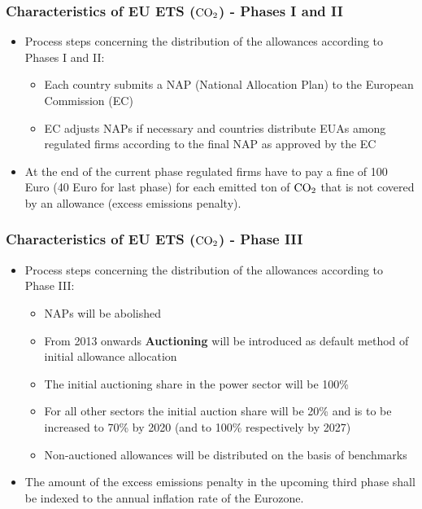   \begin{frame}
  \frametitle{Characteristics of EU ETS ($\textnormal{CO}_2$) - Phases I and II}
  \begin{itemize}
  \item<1-> Process steps concerning the distribution of the allowances according to Phases I and II:
  \begin{itemize}
  \item Each country submits a NAP (National Allocation Plan) to the European Commission (EC)
  \item EC adjusts NAPs if necessary and countries distribute EUAs among regulated firms according to the final NAP as approved by the EC
  \end{itemize}
  \item<2-> At the end of the current phase regulated firms have to pay a fine of 100 Euro (40 Euro for last phase) for each emitted ton of $\textnormal{CO}_2$ that is not covered by an allowance (excess emissions penalty).
  \end{itemize}
\end{frame}

  \begin{frame}
  \frametitle{Characteristics of EU ETS ($\textnormal{CO}_2$) - Phase III}
  \begin{itemize}
  \item<1-> Process steps concerning the distribution of the allowances according to Phase III:
  \begin{itemize}
  \item NAPs will be abolished
  \item From 2013 onwards \textbf{Auctioning} will be introduced as default method of initial allowance allocation
  \item The initial auctioning share  in the power sector will be 100\%
  \item For all other sectors the initial auction share will be 20\% and is to be increased to 70\% by 2020 (and to 100\% respectively by 2027)
  \item Non-auctioned allowances will be distributed on the basis of benchmarks
  \end{itemize}
  \item<2-> The amount of the excess emissions penalty in the upcoming third phase shall be indexed to the annual inflation rate of the Eurozone.  %
  \end{itemize}
\end{frame}

